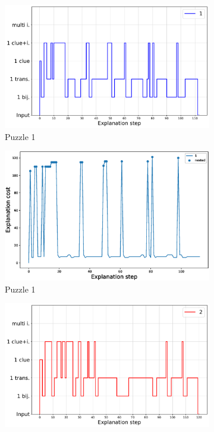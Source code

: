 \begin{figure}[t!]
		\centering
		\begin{subfigure}{.5\textwidth}
				\centering
				\includegraphics[width=0.9\linewidth]{figures/plot_cost_steps_1.pdf}
				\caption{Puzzle 1}
				\label{fig:composition_puzzle:p1}
		\end{subfigure}%
		\begin{subfigure}{.5\textwidth}
				\centering
				\includegraphics[width=0.84\linewidth]{figures/1.eps}
				\caption{Puzzle 1}
				\label{fig:cost_puzzle:p1}
		\end{subfigure}
		\begin{subfigure}{.5\textwidth}
				\centering
				\includegraphics[width=0.9\linewidth]{figures/plot_cost_steps_2.pdf}

\end{subfigure}
\end{figure}
